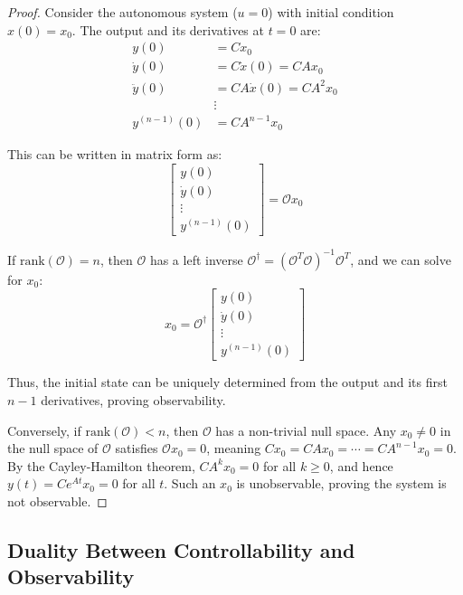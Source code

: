 \begin{proof}
Consider the autonomous system ($u = 0$) with initial condition $x(0) = x_0$. The output and its derivatives at $t = 0$ are:
\begin{align}
y(0) &= Cx_0 \\
\dot{y}(0) &= C\dot{x}(0) = CAx_0 \\
\ddot{y}(0) &= CA\dot{x}(0) = CA^2x_0 \\
&\vdots \\
y^{(n-1)}(0) &= CA^{n-1}x_0
\end{align}

This can be written in matrix form as:
\begin{equation}
\begin{bmatrix}
y(0) \\
\dot{y}(0) \\
\vdots \\
y^{(n-1)}(0)
\end{bmatrix}
= \mathcal{O} x_0
\end{equation}

If $\text{rank}(\mathcal{O}) = n$, then $\mathcal{O}$ has a left inverse $\mathcal{O}^\dagger = (\mathcal{O}^T\mathcal{O})^{-1}\mathcal{O}^T$, and we can solve for $x_0$:
\begin{equation}
x_0 = \mathcal{O}^\dagger \begin{bmatrix}
y(0) \\
\dot{y}(0) \\
\vdots \\
y^{(n-1)}(0)
\end{bmatrix}
\end{equation}

Thus, the initial state can be uniquely determined from the output and its first $n-1$ derivatives, proving observability.

Conversely, if $\text{rank}(\mathcal{O}) < n$, then $\mathcal{O}$ has a non-trivial null space. Any $x_0 \neq 0$ in the null space of $\mathcal{O}$ satisfies $\mathcal{O}x_0 = 0$, meaning $Cx_0 = CAx_0 = \cdots = CA^{n-1}x_0 = 0$. By the Cayley-Hamilton theorem, $CA^k x_0 = 0$ for all $k \geq 0$, and hence $y(t) = Ce^{At}x_0 = 0$ for all $t$. Such an $x_0$ is unobservable, proving the system is not observable.
\end{proof}

\subsection{Duality Between Controllability and Observability}

